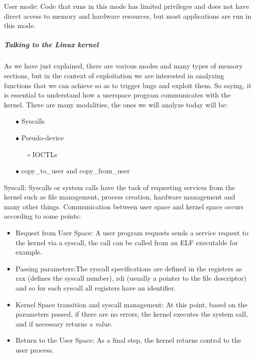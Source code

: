     User mode: Code that runs in this mode has limited privileges and does not have direct access to memory and hardware resources, but most applications are run in this mode.\newline
    \subparagraph{Talking to the Linux kernel}
    As we have just explained, there are various modes and many types of memory sections, but in the context of exploitation we are interested in analyzing functions that we can achieve so as to trigger bugs and exploit them.\newline
    So saying, it is essential to understand how a userspace program communicates with the kernel.
    There are many modalities, the ones we will analyze today will be:\newline
    \begin{itemize}
        \item[$\bullet$] Syscalls
        \item[$\bullet$] Pseudo-device
        \begin{itemize}
            \item[$\circ$] IOCTLs
        \end{itemize}
        \item[$\bullet$] copy\_to\_user and copy\_from\_user

    \end{itemize}
    \clearpage
    Syscall: 
    Syscalls or system calls have the task of requesting services from the kernel such as file management, process creation, hardware management and many other things.\newline
    Communication between user space and kernel space occurs according to some points:\newline
    \begin{itemize}
    \item Request from User Space: A user program requests sends a service request to the kernel via a syscall, the call can be called from an ELF executable for example.\newline
    \item Passing parameters:The syscall specifications are defined in the registers as rax (defines the syscall number), rdi (usually a pointer to the file descriptor) and so for each syscall all registers have an identifier.\newline
    \item Kernel Space transition and syscall management: At this point, based on the parameters passed, if there are no errors, the kernel executes the system call, and if necessary returns a value.\newline
    \item Return to the User Space: As a final step, the kernel returns control to the user process.\newline
\end{itemize}
